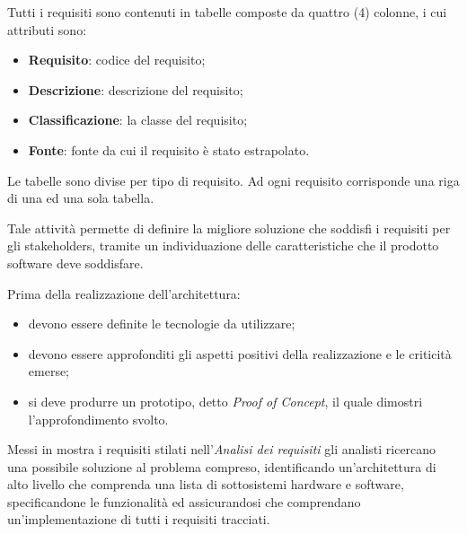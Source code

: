 	    Tutti i requisiti sono contenuti in tabelle composte da quattro (4) colonne, i cui attributi sono:
	    \begin{itemize}
	        \item \textbf{Requisito}: codice del requisito;
	        \item \textbf{Descrizione}: descrizione del requisito;
	        \item \textbf{Classificazione}: la classe del requisito;
	        \item \textbf{Fonte}: fonte da cui il requisito è stato estrapolato.
	    \end{itemize}
	    Le tabelle sono divise per tipo di requisito. Ad ogni requisito corrisponde una riga di una ed una sola tabella.
		
		Tale attività permette di definire la migliore soluzione che soddisfi i requisiti per gli stakeholders, tramite un individuazione delle caratteristiche che il prodotto software deve soddisfare.
		
		Prima della realizzazione dell'architettura:
		\begin{itemize}
			\item devono essere definite le tecnologie da utilizzare;
			\item devono essere approfonditi gli aspetti positivi della realizzazione e le criticità emerse;
			\item si deve produrre un prototipo, detto \textit{Proof of Concept}, il quale dimostri l'approfondimento svolto.
		\end{itemize}
		Messi in mostra i requisiti stilati nell'\textit{Analisi dei requisiti} gli analisti ricercano una possibile soluzione al problema compreso, identificando un'architettura di alto livello che comprenda una lista di sottosistemi hardware e software, specificandone le funzionalità ed assicurandosi che comprendano un'implementazione di tutti i requisiti tracciati.
		
